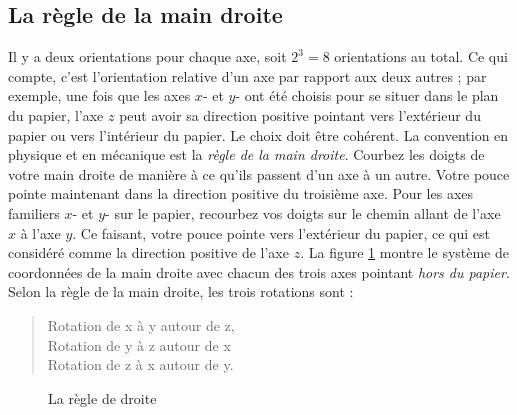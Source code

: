 \subsection{La règle de la main droite}

Il y a deux orientations pour chaque axe, soit $2^3=8$ orientations au total. Ce qui compte, c'est l'orientation relative d'un axe par rapport aux deux autres ; par exemple, une fois que les axes $x$- et $y$- ont été choisis pour se situer dans le plan du papier, l'axe $z$ peut avoir sa direction positive pointant vers l'extérieur du papier ou vers l'intérieur du papier. Le choix doit être cohérent. La convention en physique et en mécanique est la \emph{règle de la main droite}. Courbez les doigts de votre main droite de manière à ce qu'ils passent d'un axe à un autre. Votre pouce pointe maintenant dans la direction positive du troisième axe. Pour les axes familiers $x$- et $y$- sur le papier, recourbez vos doigts sur le chemin allant de l'axe $x$ à l'axe $y$. Ce faisant, votre pouce pointe vers l'extérieur du papier, ce qui est considéré comme la direction positive de l'axe $z$. La figure \ref{fig.right-hand-rule} montre le système de coordonnées de la main droite avec chacun des trois axes pointant \emph{hors du papier}. Selon la règle de la main droite, les trois rotations sont :
\begin{quote}
\normalsize
Rotation de x à y autour de z,\\
Rotation de y à z autour de x\\
Rotation de z à x autour de y.
\end{quote}

\begin{figure}
\begin{center}
\hspace{2em}
\hspace{2em}
\caption{La règle de droite}\label{fig.right-hand-rule}
\end{center}
\end{figure}

